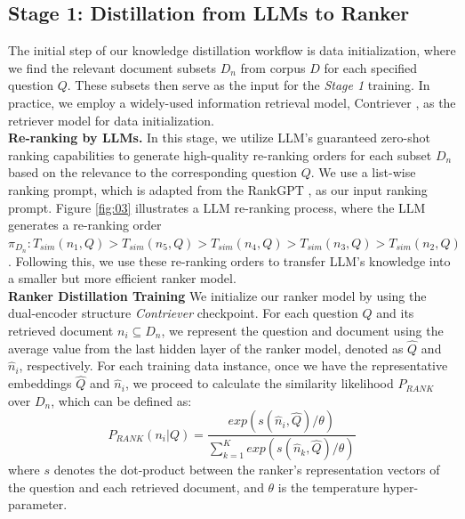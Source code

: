\subsection{Stage 1: Distillation from LLMs to Ranker} 
\label{sec:3-2}
The initial step of our knowledge distillation workflow is data initialization, where we find the relevant document subsets $D_n$ from corpus $D$ for each specified question $Q$. 
These subsets then serve as the input for the \textit{Stage 1} training.
In practice, we employ a widely-used information retrieval model, Contriever \cite{izacard2022unsupervised}, as the retriever model for data initialization. \\
\textbf{Re-ranking by LLMs.} 
In this stage, we utilize LLM's guaranteed zero-shot ranking capabilities to generate high-quality re-ranking orders for each subset $D_n$ based on the relevance to the corresponding question $Q$.
We use a list-wise ranking prompt, which is adapted from the RankGPT \cite{sun2023chatgpt}, as our input ranking prompt.
Figure \ref{fig:03} illustrates a LLM re-ranking process, where the LLM generates a re-ranking order $\pi_{D_n}: T_{sim}(n_1, Q)>T_{sim}(n_5, Q) >T_{sim}(n_4, Q) > T_{sim}(n_3, Q) > T_{sim}(n_2, Q)$. 
Following this, we use these re-ranking orders to transfer LLM's knowledge into a smaller but more efficient ranker model.
 \\
\textbf{Ranker Distillation Training}
We initialize our ranker model by using the dual-encoder structure \textit{Contriever} checkpoint.
For each question $Q$ and its retrieved document $n_i \subseteq D_n$, we represent the question and document using the average value from the last hidden layer of the ranker model, denoted as $\hat{Q}$ and $\hat{n}_i$, respectively.
For each training data instance, once we have the representative embeddings $\hat{Q}$ and $\hat{n}_i$, we proceed to calculate the similarity likelihood $P_{RANK}$ over $D_n$, which can be defined as:
\begin{equation}
    P_{RANK}(n_i|Q) = \frac{exp(s(\hat{n}_i, \hat{Q})/\theta)}{\sum_{k=1}^Kexp(s(\hat{n}_k, \hat{Q})/\theta)}
\end{equation}
where $s$ denotes the dot-product between the ranker's representation vectors of the question and each retrieved document, and $\theta$ is the temperature hyper-parameter.

